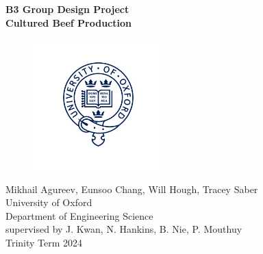
\vspace*{2cm}
\begin{center}
\huge{\textbf{B3 Group Design Project}}\\
\huge{\textbf{Cultured Beef Production}}\\
\begin{figure}[h]
    \centering
    \includegraphics[width=0.45\textwidth]{y0-oxford.jpg}
    \hfill
\end{figure}
\vspace*{-1cm}
{\Large Mikhail Agureev, Eunsoo Chang, Will Hough, Tracey Saber}\\ %
{\Large University of Oxford}\\ %
\vspace*{1cm}
{\large Department of Engineering Science}\\ %
{\large supervised by J. Kwan, N. Hankins, B. Nie, P. Mouthuy}\\[0.5cm] %
\vspace*{0.5cm}
{\large Trinity Term 2024}

\thispagestyle{empty} %
\end{center}